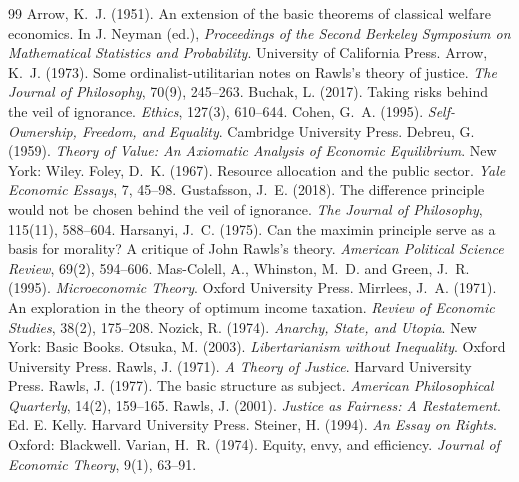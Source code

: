 \documentclass{situationist-preprint}
\begin{document}
\begin{thebibliography}{99}\small
{} Arrow, K.~J. (1951). An extension of the basic theorems of classical welfare economics. In J. Neyman (ed.), \emph{Proceedings of the Second Berkeley Symposium on Mathematical Statistics and Probability}. University of California Press.
 Arrow, K.~J. (1973). Some ordinalist-utilitarian notes on Rawls's theory of justice. \emph{The Journal of Philosophy}, 70(9), 245--263.
 Buchak, L. (2017). Taking risks behind the veil of ignorance. \emph{Ethics}, 127(3), 610--644.
 Cohen, G.~A. (1995). \emph{Self-Ownership, Freedom, and Equality}. Cambridge University Press.
 Debreu, G. (1959). \emph{Theory of Value: An Axiomatic Analysis of Economic Equilibrium}. New York: Wiley.
 Foley, D.~K. (1967). Resource allocation and the public sector. \emph{Yale Economic Essays}, 7, 45--98.
 Gustafsson, J.~E. (2018). The difference principle would not be chosen behind the veil of ignorance. \emph{The Journal of Philosophy}, 115(11), 588--604.
 Harsanyi, J.~C. (1975). Can the maximin principle serve as a basis for morality? A critique of John Rawls's theory. \emph{American Political Science Review}, 69(2), 594--606.
 Mas-Colell, A., Whinston, M.~D. and Green, J.~R. (1995). \emph{Microeconomic Theory}. Oxford University Press.
 Mirrlees, J.~A. (1971). An exploration in the theory of optimum income taxation. \emph{Review of Economic Studies}, 38(2), 175--208.
 Nozick, R. (1974). \emph{Anarchy, State, and Utopia}. New York: Basic Books.
 Otsuka, M. (2003). \emph{Libertarianism without Inequality}. Oxford University Press.
 Rawls, J. (1971). \emph{A Theory of Justice}. Harvard University Press.
 Rawls, J. (1977). The basic structure as subject. \emph{American Philosophical Quarterly}, 14(2), 159--165.
 Rawls, J. (2001). \emph{Justice as Fairness: A Restatement}. Ed. E. Kelly. Harvard University Press.
 Steiner, H. (1994). \emph{An Essay on Rights}. Oxford: Blackwell.
 Varian, H.~R. (1974). Equity, envy, and efficiency. \emph{Journal of Economic Theory}, 9(1), 63--91.
\end{thebibliography}
\end{document}
